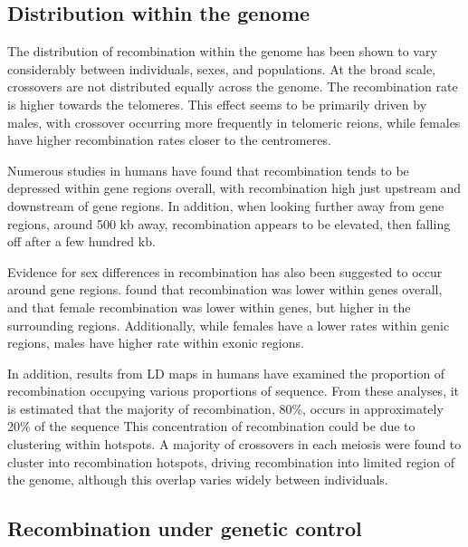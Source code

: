 \subsection{Distribution within the genome}

The distribution of recombination within the genome has been shown to vary considerably between individuals, sexes, and populations.
At the broad scale, crossovers are not distributed equally across the genome.
The recombination rate is higher towards the telomeres\cite{Broman1998,Mcvean2004,hapmap2007}.
This effect seems to be primarily driven by males, with crossover occurring more frequently in telomeric reions, while females have higher recombination rates closer to the centromeres\cite{Kong2002,Coop2008,Kong2010}.

Numerous studies in humans have found that recombination tends to be depressed within gene regions overall, with recombination high just upstream and downstream of gene regions\cite{Mcvean2004,Myers2005,hapmap2007,Spencer2006,Kong2010}.
In addition, when looking further away from gene regions, around 500 kb away, recombination appears to be elevated, then falling off after a few hundred kb.

Evidence for sex differences in recombination has also been suggested to occur around gene regions.
\citet{Kong2010} found that recombination was lower within genes overall, and that
female recombination was lower within genes, but higher in the surrounding regions.
Additionally, while females have a lower rates within genic regions, males have higher rate within exonic regions.

In addition, results from LD maps in humans have examined the proportion of recombination occupying various proportions of sequence.
From these analyses, it is estimated that the majority of recombination, 80\%, occurs in approximately 20\% of the sequence\cite{Mcvean2004,Myers2005,hapmap2007}
This concentration of recombination could be due to clustering within hotspots.
A majority of crossovers in each meiosis were found to cluster into recombination hotspots, driving recombination into limited region of the genome\cite{Coop2008}, although this overlap varies widely between individuals.


\subsection{Recombination under genetic control}

